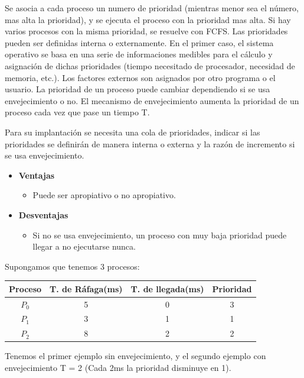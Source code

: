 \documentclass{article}
\begin{document}
Se asocia a cada proceso un numero de prioridad (mientras menor sea el número, mas alta la prioridad), y
se ejecuta el proceso con la prioridad mas alta. Si hay varios procesos con la misma prioridad, se resuelve con FCFS.
Las prioridades pueden ser definidas interna o externamente.
En el primer caso, el sistema operativo se basa en una serie de informaciones medibles para el cálculo 
y asignación de dichas prioridades (tiempo necesitado de procesador, necesidad de memoria, etc.). 
Los factores externos son asignados por otro programa o el usuario.
La prioridad de un proceso puede cambiar dependiendo si se usa envejecimiento o no.
El mecanismo de envejecimiento aumenta la prioridad de un proceso cada vez que pase un tiempo T.

Para su implantación se necesita una cola de prioridades, indicar si las prioridades
se definirán de manera interna o externa y la razón de incremento si se usa
envejecimiento.

\begin{itemize}
	\item \textbf{Ventajas}
	\begin{itemize}
		\item Puede ser apropiativo o no apropiativo.
	\end{itemize}
	
	\item \textbf{Desventajas}
	\begin{itemize}
		\item Si no se usa envejecimiento, un proceso con muy baja prioridad puede llegar
		a no ejecutarse nunca.
	\end{itemize}
\end{itemize}

Supongamos que tenemos 3 procesos:
\begin{center}
	\begin{tabular}{|c|c|c|c|} \hline
		Proceso & T. de Ráfaga(ms) & T. de llegada(ms) & Prioridad \\ \hline
		$P_{0}$ & 5 & 0 & 3 \\ 
		$P_{1}$ & 3 & 1 & 1 \\ 
		$P_{2}$ & 8 & 2 & 2 \\ \hline
	\end{tabular}
\end{center}

Tenemos el primer ejemplo sin envejecimiento, y el segundo ejemplo con 
envejecimiento T = 2 (Cada 2ms la prioridad disminuye en 1).

\vspace{0.4cm}
\end{document}
